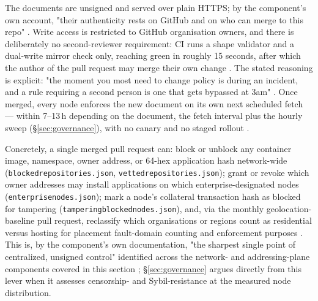 The documents are unsigned and served over plain HTTPS; by the component's own account, "their
authenticity rests on GitHub and on who can merge to this repo"
. Write access is restricted to GitHub
organisation owners, and there is deliberately no second-reviewer requirement: CI runs a shape
validator and a dual-write mirror check only, reaching green in roughly 15 seconds, after which
the author of the pull request may merge their own change
. The stated reasoning is
explicit: "the moment you most need to change policy is during an incident, and a rule requiring a
second person is one that gets bypassed at 3am"
. Once merged, every \FluxOS node enforces
the new document on its own next scheduled fetch — within 7--13\,h depending on the document, the
fetch interval plus the hourly sweep (\S\ref{sec:governance}), with
no canary and no staged rollout . \shipped

Concretely, a single merged pull request can: block or unblock any container image, namespace,
owner address, or 64-hex application hash network-wide (\texttt{blockedrepositories.\allowbreak{}json},
\texttt{vettedrepositories.\allowbreak{}json}); grant or revoke which owner addresses may install applications
on which enterprise-designated nodes (\texttt{enterprisenodes.\allowbreak{}json}); mark a node's collateral
transaction hash as blocked for tampering (\texttt{tamperingblockednodes.\allowbreak{}json}),  and, via the monthly
geolocation-baseline pull request, reclassify which organisations or regions count as residential
versus hosting for placement fault-domain counting and enforcement purposes
. This is, by the component's own
documentation, "the sharpest single point of centralized, unsigned control" identified across the
network- and addressing-plane components covered in this section
; \S\ref{sec:governance} argues directly from this
lever when it assesses censorship- and Sybil-resistance at the measured node distribution. \shipped

